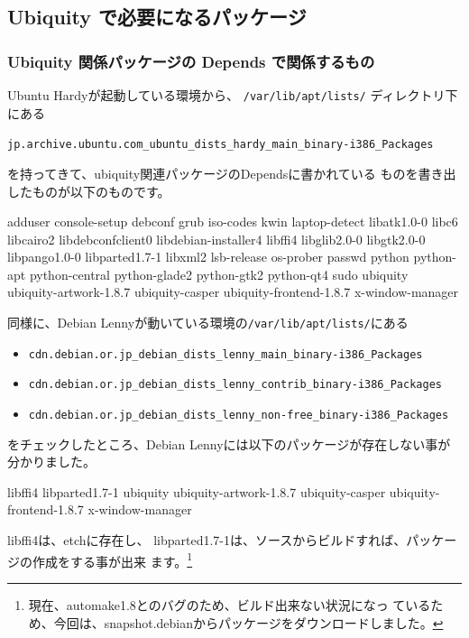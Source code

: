 \documentclass[mingoth,a4paper]{jsarticle}
\begin{document}
\subsection{Ubiquity で必要になるパッケージ}

\subsubsection{Ubiquity 関係パッケージの Depends で関係するもの}
\label{sec:depends}

Ubuntu Hardyが起動している環境から、
{\tt /var/lib/apt/lists/}
ディレクトリ下にある

{\tt jp.archive.ubuntu.com\_ubuntu\_dists\_hardy\_main\_binary-i386\_Packages}

を持ってきて、ubiquity関連パッケージのDependsに書かれている
ものを書き出したものが以下のものです。

\begin{commandline}
adduser
console-setup
debconf
grub
iso-codes
kwin
laptop-detect
libatk1.0-0
libc6
libcairo2
libdebconfclient0
libdebian-installer4
libffi4
libglib2.0-0
libgtk2.0-0
libpango1.0-0
libparted1.7-1
libxml2
lsb-release
os-prober
passwd
python
python-apt
python-central
python-glade2
python-gtk2
python-qt4
sudo
ubiquity
ubiquity-artwork-1.8.7
ubiquity-casper
ubiquity-frontend-1.8.7
x-window-manager
\end{commandline}

同様に、Debian Lennyが動いている環境の{\tt /var/lib/apt/lists/}にある

\begin{itemize}
 \item {\tt cdn.debian.or.jp\_debian\_dists\_lenny\_main\_binary-i386\_Packages}
 \item {\tt cdn.debian.or.jp\_debian\_dists\_lenny\_contrib\_binary-i386\_Packages}
 \item {\tt cdn.debian.or.jp\_debian\_dists\_lenny\_non-free\_binary-i386\_Packages}
\end{itemize}

をチェックしたところ、Debian Lennyには以下のパッケージが存在しない事が
分かりました。

\begin{commandline}
libffi4
libparted1.7-1
ubiquity
ubiquity-artwork-1.8.7
ubiquity-casper
ubiquity-frontend-1.8.7
x-window-manager
\end{commandline}

libffi4は、etchに存在し、
libparted1.7-1は、ソースからビルドすれば、パッケージの作成をする事が出来
ます。\footnote{現在、automake1.8とのバグのため、ビルド出来ない状況になっ
ているため、今回は、snapshot.debianからパッケージをダウンロードしました。}
\end{document}
